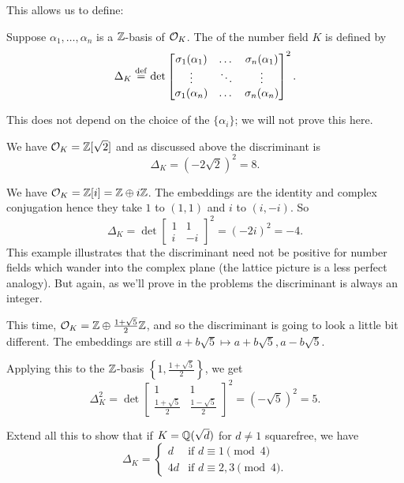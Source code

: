This allows us to define:
\begin{definition}
	Suppose $\alpha_1, \dots, \alpha_n$ is a $\mathbb Z$-basis of $\mathcal O_K$.
	The  of the number field $K$ is defined by
	\[
	\Delta_K \overset{\mathrm{def}}{=} \det 
	\begin{bmatrix}
		\sigma_1(\alpha_1) & \dots & \sigma_n(\alpha_1) \\
		\vdots & \ddots & \vdots \\
		\sigma_1(\alpha_n) & \dots & \sigma_n(\alpha_n) \\
	\end{bmatrix}^2.
	\]
\end{definition}
This does not depend on the choice of the $\{\alpha_i\}$;
we will not prove this here.
\begin{example}[Discriminant of $K = \QQ(\sqrt2)$]
	We have $\mathcal O_K = \mathbb Z[\sqrt 2]$
	and as discussed above the discriminant is
	\[
		\Delta_K = 
		(-2 \sqrt 2)^2 = 8.
	\]
\end{example}
\begin{example}[Discriminant of $\QQ(i)$]
	We have $\mathcal O_K = \mathbb Z[i] = \mathbb Z \oplus i \mathbb Z$.
	The embeddings are the identity and complex conjugation
	hence they take $1$ to $(1,1)$ and $i$ to $(i, -i)$.
	So
	\[
		\Delta_K = 
		\det 
		\begin{bmatrix}
			1 & 1 \\
			i & -i
		\end{bmatrix}^2
		=
		(-2i)^2 = -4.
	\]
	This example illustrates that the discriminant need not be positive
	for number fields which wander into the complex plane
	(the lattice picture is a less perfect analogy).
	But again, as we'll prove in the problems the discriminant is always
	an integer.
\end{example}
\begin{example}
	This time, $\mathcal O_K = \mathbb Z \oplus \frac{1+\sqrt5}{2} \mathbb Z$, and so the discriminant
	is going to look a little bit different.
	The embeddings are still $a+b\sqrt 5 \mapsto a+b\sqrt5, a-b\sqrt5$.

	Applying this to the $\mathbb Z$-basis $\left\{ 1, \frac{1+\sqrt5}{2} \right\}$, we get
	\[
		\Delta_K^2
		=
		\det
		\begin{bmatrix}
			1 & 1 \\
			\frac{1+\sqrt5}{2} & \frac{1-\sqrt5}{2}
		\end{bmatrix}^2
		= (-\sqrt 5)^2 = 5.
	\]
\end{example}
\begin{exercise}
	Extend all this to show that
	if $K = \mathbb Q(\sqrt d)$ for $d \neq 1$ squarefree, we have
	\[
		\Delta_K =
		\begin{cases}
			d & \text{if } d \equiv 1 \pmod 4 \\
			4d & \text{if } d \equiv 2, 3 \pmod 4.
		\end{cases}
	\]
\end{exercise}

